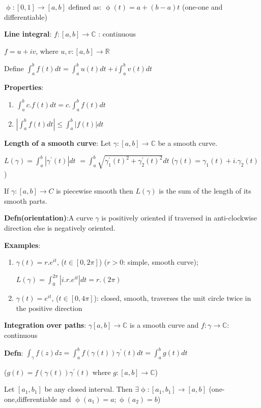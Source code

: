 \documentclass{article}
\begin{document}
\begin{flushleft}
$\upphi:[0,1]\rightarrow [a,b]$ defined as: $\upphi(t)=a+(b-a)t$ (one-one and differentiable)

\textbf{Line integral}: $f:[a,b]\rightarrow \mathds{C}$ : continuous

$f=u+iv$, where $u,v:[a,b]\rightarrow \mathds{R}$

Define $\int_{a}^{b}f(t) dt= \int_{a}^{b}u(t) dt+ i \int_{a}^{b} v(t) dt$

\textbf{Properties}:

\begin{enumerate}
    \item $\int_{a}^{b} c.f(t) dt= c.\int_{a}^{b}f(t) dt$
    \item $| \int_{a}^{b}f(t) dt |\leq \int_{a}^{b}|f(t)| dt$
\end{enumerate}
\textbf{Length of a smooth curve}: Let $\gamma:[a,b]\rightarrow \mathds{C}$ be a smooth curve. 

$L(\gamma)= \int_{a}^{b} |\gamma^{'}(t)| dt$
$=\int_{a}^{b} \sqrt{\gamma_1^{'}(t)^2+\gamma_2^{'}(t)^2}  dt$  ($\gamma(t)=\gamma_1(t)+i.\gamma_2(t)$)

If $\gamma:[a,b]\rightarrow C$ is piecewise smooth then $L(\gamma)$ is the sum of the length of its smooth parts.

\textbf{Defn(orientation)}:A curve $\gamma$ is positively oriented if traversed in anti-clockwise direction else is negatively oriented.

\textbf{Examples}:
\begin{enumerate}
    \item $\gamma(t)=r.e^{it}$, ($t\in [0,2\pi]$) ($r>0$: simple, smooth curve); 
    
    $L(\gamma)=\int_{0}^{2\pi} |i.r.e^{it}| dt= r.(2\pi)$
    
    \item $\gamma(t)=e^{it}$, ($t \in [0,4\pi]$): closed, smooth, traverses the unit circle twice in the positive direction
\end{enumerate}
\textbf{Integration over paths}:
$\gamma[a,b]\rightarrow \mathds{C}$ is a smooth curve and $f:\gamma \rightarrow \mathds{C}$: continuous 

\textbf{Defn}: $\int_{\gamma}^{} f(z) dz= \int_{a}^{b} f(\gamma(t)) \gamma^{'}(t) dt=\int_{a}^{b}g(t) dt$ 

($g(t)=f(\gamma(t)) \gamma^{'}(t)$ where $g:[a,b]\rightarrow \mathds{C}$)

Let $[a_1,b_1]$ be any closed interval. Then $\exists \upphi:[a_1,b_1]\rightarrow [a,b]$ (one-one,differentiable and $\upphi(a_1)=a;\upphi(a_2)=b$)


\end{flushleft}
\end{document}
